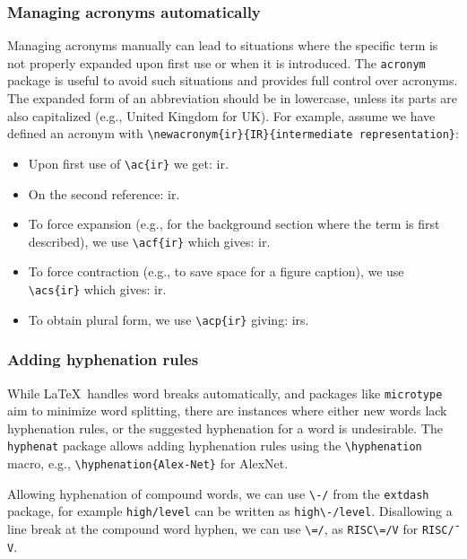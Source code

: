 \documentclass[review, anonymous, acmsmall]{acmart}
\newenvironment{draftonly}{}{}
\begin{document}
\begin{draftonly}
\subsubsection{Managing acronyms automatically}
Managing acronyms manually can lead to situations where the specific term is not properly expanded upon first use or when it is introduced.
The \texttt{acronym} package is useful to avoid such situations and provides full control over acronyms.
The expanded form of an abbreviation should be in lowercase, unless its parts are also capitalized (e.g., United Kingdom for UK).
For example, assume we have defined an acronym with \texttt{\textbackslash{}newacronym\{ir\}\{IR\}\{intermediate representation\}}:
\begin{itemize}
  \item Upon first use of \texttt{\textbackslash{}ac\{ir\}} we get: \ac{ir}.
  \item On the second reference: \ac{ir}.
  \item To force expansion (e.g., for the background section where the term is first described), we use \texttt{\textbackslash{}acf\{ir\}} which gives: \acf{ir}.
  \item To force contraction (e.g., to save space for a figure caption), we use \texttt{\textbackslash{}acs\{ir\}} which gives: \acs{ir}.
  \item To obtain plural form, we use \texttt{\textbackslash{}acp\{ir\}} giving: \acp{ir}.
\end{itemize}

\subsubsection{Adding hyphenation rules}
While \LaTeX\ handles word breaks automatically, and packages like \texttt{microtype} aim to minimize word splitting, there are instances where either new words lack hyphenation rules, or the suggested hyphenation for a word is undesirable.
The \texttt{hyphenat} package allows adding hyphenation rules using the \texttt{\textbackslash{}hyphenation} macro, e.g., \texttt{\textbackslash{}hyphenation\{Alex-Net\}} for AlexNet.

Allowing hyphenation of compound words, we can use \texttt{\textbackslash{}-/} from the \texttt{extdash} package, for example \texttt{high\-/level} can be written as \texttt{high\textbackslash{}-/level}.
Disallowing a line break at the compound word hyphen, we can use \texttt{\textbackslash{}=/}, as \texttt{RISC\textbackslash{}=/V} for \texttt{RISC\=/V}.

\end{draftonly}
\end{document}
